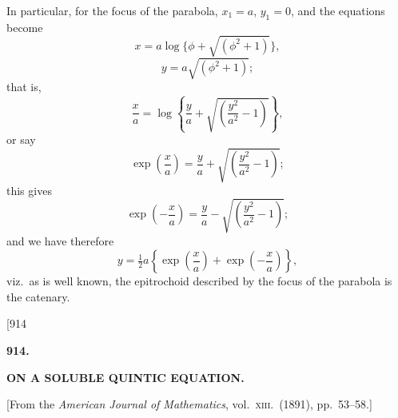 \documentclass[11pt]{article}
\begin{document}
\hspace{1em} In particular, for the focus of the parabola, $x_{1}=a$,
$y_{1}=0$, and the equations become
\[
x=a\log\{\phi+\sqrt{(\phi^{2}+1)}\},
\]
\[
y=a\sqrt{(\phi^{2}+1)};
\]
that is,
\[
\frac{x}{a}=\log\!\left\{\frac{y}{a}+\sqrt{\left(\frac{y^{2}}{a^{2}}-1\right)}\right\},
\]
or say
\[
\exp\!\left(\frac{x}{a}\right)=\frac{y}{a}+\sqrt{\left(\frac{y^{2}}{a^{2}}-1\right)};
\]
this gives
\[
\exp\!\left(-\frac{x}{a}\right)=\frac{y}{a}-\sqrt{\left(\frac{y^{2}}{a^{2}}-1\right)};
\]
and we have therefore
\[
y=\tfrac{1}{2}a\left\{\exp\!\left(\frac{x}{a}\right)+\exp\!\left(-\frac{x}{a}\right)\right\},
\]
viz.\ as is well known, the epitrochoid described by the focus of the parabola
is the catenary.


\newpage
\hfill[914

\vspace{2em}
\begin{center}\large\textbf{914.}\end{center}
\begin{center}\large\textbf{ON A SOLUBLE QUINTIC EQUATION.}\end{center}
\vspace{0.5em}
\begin{center}\small[From the \emph{American Journal of Mathematics}, vol.\ \textsc{xiii}.\ (1891), pp.\ 53--58.]\end{center}
\vspace{1em}
\end{document}
